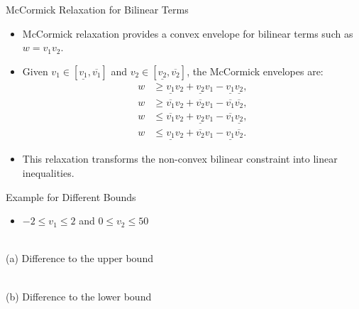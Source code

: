 \documentclass[shortpres,aspectratio=43]{beamer}
\begin{document}
\begin{frame}{McCormick Relaxation for Bilinear Terms}
  \begin{itemize}
    \item McCormick relaxation provides a convex envelope for bilinear terms such as $w = v_1v_2$.
    \item Given $v_1\in[\underline{v_1}, \overline{v_1}]$ and $v_2\in[\underline{v_2}, \overline{v_2}]$, the McCormick envelopes are:
          \begin{align*}
            w & \geq \underline{v_1} v_2 + \underline{v_2} v_1 - \underline{v_1} \underline{v_2}, \\
            w & \geq \overline{v_1} v_2 + \overline{v_2} v_1 - \overline{v_1} \overline{v_2},     \\
            w & \leq \overline{v_1} v_2 + \underline{v_2} v_1 - \overline{v_1} \underline{v_2},   \\
            w & \leq \underline{v_1} v_2 + \overline{v_2} v_1 - \underline{v_1} \overline{v_2}.
          \end{align*}
    \item This relaxation transforms the non-convex bilinear constraint into linear inequalities.
  \end{itemize}
\end{frame}

\begin{frame}{Example for Different Bounds}
  \begin{itemize}
    \item $ -2 \leq v_1 \leq 2 $ and $ 0 \leq v_2 \leq 50 $
  \end{itemize}

  \centering
  \begin{minipage}[b]{0.45\textwidth}
    \centering
    \resizebox{\textwidth}{!}{}\\
    \small (a) Difference to the upper bound
  \end{minipage}
  \hfill
  \begin{minipage}[b]{0.45\textwidth}
    \centering
    \resizebox{\textwidth}{!}{}\\
    \small (b) Difference to the lower bound
  \end{minipage}

\end{frame}
\end{document}

